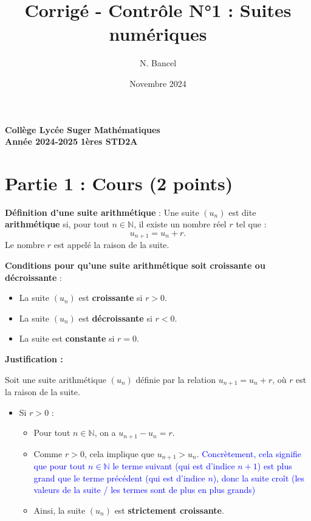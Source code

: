 \documentclass{exam}
\title{Corrigé - Contrôle N°1 : Suites numériques}
\author{N. Bancel}
\date{Novembre 2024}
\begin{document}
\textbf{Collège Lycée Suger}
\hfill
\textbf{Mathématiques} \\

\textbf{Année 2024-2025}
\hfill
\textbf{1ères STD2A} \par

{\let\newpage\relax\maketitle}

\section*{Partie 1 : Cours (2 points)}

\begin{questions}
  \question[0.5] \textbf{Définition d'une suite arithmétique} :
  Une suite $(u_n)$ est dite \textbf{arithmétique} si, pour tout $n \in \mathbb{N}$, il existe un nombre réel $r$ tel que :
  \[
  u_{n+1} = u_n + r.
  \]
  Le nombre $r$ est appelé la raison de la suite.

  \question[0.5] \textbf{Conditions pour qu'une suite arithmétique soit croissante ou décroissante} :
  \begin{itemize}[noitemsep]
    \item La suite $(u_n)$ est \textbf{croissante} si $r > 0$.
    \item La suite $(u_n)$ est \textbf{décroissante} si $r < 0$.
    \item La suite est \textbf{constante} si $r = 0$.
  \end{itemize}

  \textbf{Justification :}

Soit une suite arithmétique \((u_n)\) définie par la relation \( u_{n+1} = u_n + r \), où \( r \) est la raison de la suite. 

\begin{itemize}
    \item Si \( r > 0 \) :
    \begin{itemize}
        \item Pour tout \( n \in \mathbb{N} \), on a \( u_{n+1} - u_n = r \).
        \item Comme \( r > 0 \), cela implique que \( u_{n+1} > u_n \). \textcolor{blue}{Concrètement, cela signifie que pour tout \( n \in \mathbb{N} \) le terme suivant (qui est d'indice $n+1$) est plus grand que le terme précédent (qui est d'indice $n$), donc la suite croît (les valeurs de la suite / les termes sont de plus en plus grands)}
        \item Ainsi, la suite \((u_n)\) est \textbf{strictement croissante}.
    \end{itemize}


\end{itemize}
\end{questions}
\end{document}

